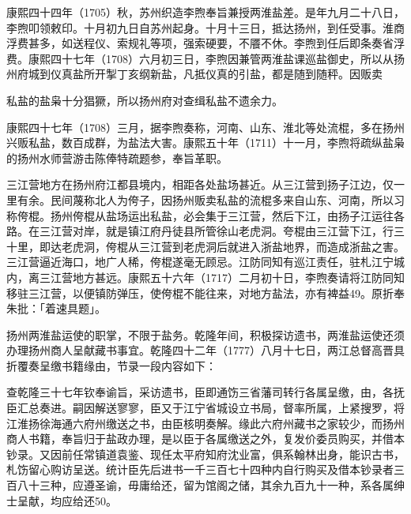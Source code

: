 康熙四十四年（1705）秋，苏州织造李煦奉旨兼授两淮盐差。是年九月二十八日，李煦叩领敕印。十月初九日自苏州起身。十月十三日，抵达扬州，到任受事。淮商浮费甚多，如送程仪、索规礼等项，强索硬要，不餍不休。李煦到任后即条奏省浮费。康熙四十七年（1708）六月初三日，李煦因兼管两淮盐课巡盐御史，所以从扬州府城到仪真盐所开掣丁亥纲新盐，凡抵仪真的引盐，都是随到随秤。因贩卖


\noindent 私盐的盐枭十分猖獗，所以扬州府对查缉私盐不遗余力。

康熙四十七年（1708）三月，据李煦奏称，河南、山东、淮北等处流棍，多在扬州兴贩私盐，数百成群，为盐法大害。康熙五十年（1711）十一月，李煦将疏纵盐枭的扬州水师营游击陈俸特疏题参，奉旨革职。

三江营地方在扬州府江都县境内，相距各处盐场甚近。从三江营到扬子江边，仅一里有余。民间蔑称北人为侉子，因扬州贩卖私盐的流棍多来自山东、河南，所以习称侉棍。扬州侉棍从盐场运出私盐，必会集于三江营，然后下江，由扬子江运往各路。在三江营对岸，就是镇江府丹徒县所管徐山老虎洞。夸棍由三江营下江，行三十里，即达老虎洞，侉棍从三江营到老虎洞后就进入浙盐地界，而造成浙盐之害。三江营逼近海口，地广人稀，侉棍遂毫无顾忌。江防同知有巡江责任，驻札江宁城内，离三江营地方甚远。康熙五十六年（1717）二月初十日，李煦奏请将江防同知移驻三江营，以便镇防弹压，使侉棍不能往来，对地方盐法，亦有裨益49。原折奉朱批：「着速具题」。

扬州两淮盐运使的职掌，不限于盐务。乾隆年间，积极探访遗书，两淮盐运使还须办理扬州商人呈献藏书事宜。乾隆四十二年（1777）八月十七日，两江总督高晋具折覆奏呈缴书籍缘由，节录一段内容如下：

\begin{BookQuote}
查乾隆三十七年钦奉谕旨，采访遗书，臣即通饬三省藩司转行各属呈缴，由，各抚臣汇总奏进。嗣因解送寥寥，臣又于江宁省城设立书局，督率所属，上紧搜罗，将江淮扬徐海通六府州缴送之书，由臣核明奏解。缘此六府州藏书之家较少，而扬州商人书籍，奉旨归于盐政办理，是以臣于各属缴送之外，复发价委员购买，并借本钞录。又因前任常镇道袁鉴、现任太平府知府沈业富，俱系翰林出身，能识古书，札饬留心购访呈送。统计臣先后进书一千三百七十四种内自行购买及借本钞录者三百八十三种，应遵圣谕，毋庸给还，留为馆阁之储，其余九百九十一种，系各属绅士呈献，均应给还50。
\end{BookQuote}

\vfill
\begin{BookNotes}
\end{BookNotes}

